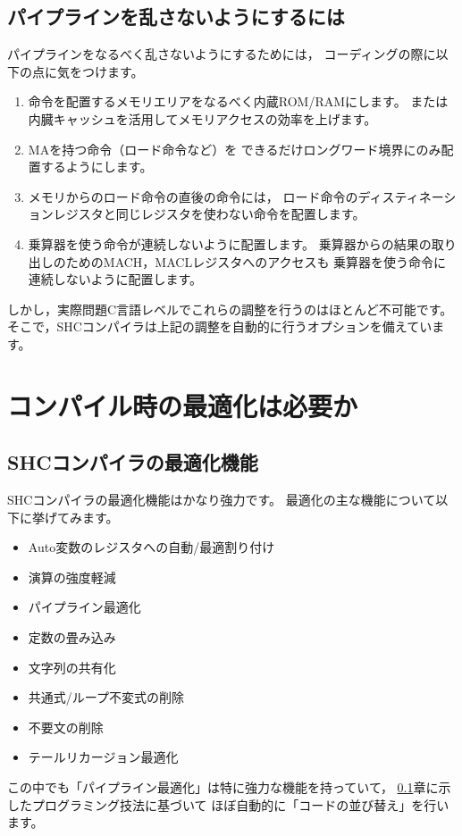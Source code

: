 \documentclass[a4j,10pt,fleqn]{jsarticle}
\begin{document}
\subsection{パイプラインを乱さないようにするには} \label{sec:pipeline}

パイプラインをなるべく乱さないようにするためには，
コーディングの際に以下の点に気をつけます。

\begin{enumerate}

\item 命令を配置するメモリエリアをなるべく内蔵ROM/RAMにします。
    または内臓キャッシュを活用してメモリアクセスの効率を上げます。

\item MAを持つ命令（ロード命令など）を
    できるだけロングワード境界にのみ配置するようにします。

\item メモリからのロード命令の直後の命令には，
    ロード命令のディスティネーションレジスタと同じレジスタを使わない命令を配置します。

\item 乗算器を使う命令が連続しないように配置します。
    乗算器からの結果の取り出しのためのMACH，MACLレジスタへのアクセスも
    乗算器を使う命令に連続しないように配置します。

\end{enumerate}

しかし，実際問題C言語レベルでこれらの調整を行うのはほとんど不可能です。
そこで，SHCコンパイラは上記の調整を自動的に行うオプションを備えています。


\section{コンパイル時の最適化は必要か} \label{sec:optimize}

\subsection{SHCコンパイラの最適化機能}

SHCコンパイラの最適化機能はかなり強力です。
最適化の主な機能について以下に挙げてみます。
\begin{itemize}
\item Auto変数のレジスタへの自動/最適割り付け
\item 演算の強度軽減
\item パイプライン最適化
\item 定数の畳み込み
\item 文字列の共有化
\item 共通式/ループ不変式の削除
\item 不要文の削除
\item テールリカージョン最適化
\end{itemize}
この中でも「パイプライン最適化」は特に強力な機能を持っていて，
\ref{sec:pipeline}章に示したプログラミング技法に基づいて
ほぼ自動的に「コードの並び替え」を行います。
\end{document}
